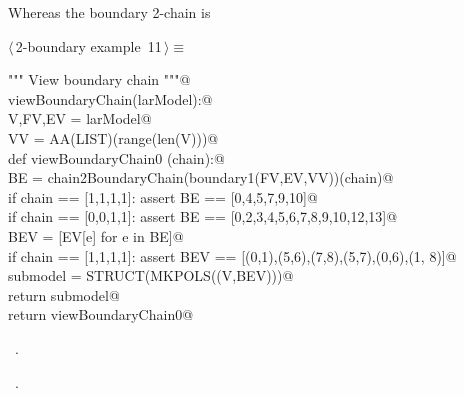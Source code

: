 \documentclass[11pt,oneside]{article}	%
\begin{document}
Whereas the boundary 2-chain is
\begin{flushleft} \small \label{scrap19}
\protect{}$\langle\,$2-boundary example\nobreak\ {\footnotesize 11}$\,\rangle\equiv$
\vspace{-1ex}
\begin{list}{}{} \item
\mbox{}\verb@""" View boundary chain """@\\
\mbox{}\verb@def viewBoundaryChain(larModel):@\\
\mbox{}\verb@    V,FV,EV = larModel@\\
\mbox{}\verb@    VV = AA(LIST)(range(len(V)))@\\
\mbox{}\verb@    def viewBoundaryChain0 (chain):@\\
\mbox{}\verb@        BE = chain2BoundaryChain(boundary1(FV,EV,VV))(chain)@\\
\mbox{}\verb@        if chain == [1,1,1,1]: assert BE == [0,4,5,7,9,10]@\\
\mbox{}\verb@        if chain == [0,0,1,1]: assert BE == [0,2,3,4,5,6,7,8,9,10,12,13]@\\
\mbox{}\verb@        BEV = [EV[e] for e in BE]@\\
\mbox{}\verb@        if chain == [1,1,1,1]: assert BEV == [(0,1),(5,6),(7,8),(5,7),(0,6),(1, 8)]@\\
\mbox{}\verb@        submodel = STRUCT(MKPOLS((V,BEV)))@\\
\mbox{}\verb@        return submodel@\\
\mbox{}\verb@    return viewBoundaryChain0@\\
\mbox{}\verb@@{\NWsep}
\end{list}
\vspace{-1ex}
\footnotesize\addtolength{\baselineskip}{-1ex}
\begin{list}{}{\setlength{\itemsep}{-\parsep}\setlength{\itemindent}{-\leftmargin}}
\item \NWtxtMacroDefBy\ .
\item \NWtxtMacroRefIn\ .
\end{list}
\end{flushleft}
\end{document}

